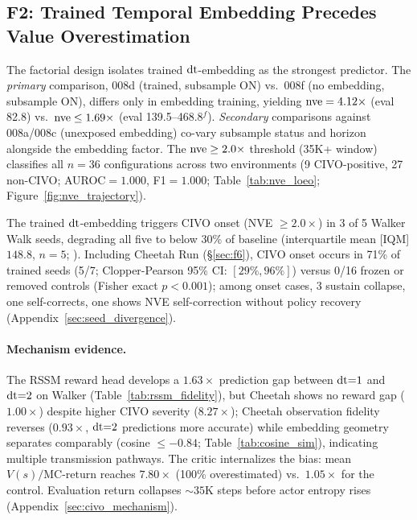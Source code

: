 
\subsection{F2: Trained Temporal Embedding Precedes Value Overestimation}
\label{sec:f2}

 The factorial design isolates trained $\mathrm{dt}$-embedding as the strongest predictor. The \emph{primary} comparison, 008d (trained, subsample ON) vs.\ 008f (no embedding, subsample ON), differs only in embedding training, yielding $\mathrm{nve} = 4.12\times$ (eval 82.8) vs.\ $\mathrm{nve} \leq 1.69\times$ (eval 139.5--468.8$^f$). \emph{Secondary} comparisons against 008a/008c (unexposed embedding) co-vary subsample status and horizon alongside the embedding factor. The $\mathrm{nve} \geq 2.0\times$ threshold (35K+ window) classifies all $n{=}36$ configurations across two environments (9 CIVO-positive, 27 non-CIVO; AUROC${=}1.000$, F1${=}1.000$; Table~\ref{tab:nve_loeo}; Figure~\ref{fig:nve_trajectory}).

 The trained $\mathrm{dt}$-embedding triggers CIVO onset (NVE $\geq 2.0\times$) in 3 of 5 Walker Walk seeds, degrading all five to below 30\% of baseline (interquartile mean [IQM] $148.8$, $n{=}5$; \citet{agarwal2021precipice}). Including Cheetah Run (\S\ref{sec:f6}), CIVO onset occurs in 71\% of trained seeds (5/7; Clopper-Pearson 95\% CI: $[29\%, 96\%]$) versus 0/16 frozen or removed controls (Fisher exact $p < 0.001$); among onset cases, 3 sustain collapse, one self-corrects, one shows NVE self-correction without policy recovery (Appendix~\ref{sec:seed_divergence}).

\paragraph{Mechanism evidence.}
 The RSSM reward head develops a $1.63\times$ prediction gap between $\mathrm{dt}{=}1$ and $\mathrm{dt}{=}2$ on Walker (Table~\ref{tab:rssm_fidelity}), but Cheetah shows no reward gap ($1.00\times$) despite higher CIVO severity ($8.27\times$); Cheetah observation fidelity reverses ($0.93\times$, $\mathrm{dt}{=}2$ predictions more accurate) while embedding geometry separates comparably (cosine ${\leq}{-}0.84$; Table~\ref{tab:cosine_sim}), indicating multiple transmission pathways. The critic internalizes the bias: mean $V(s)/\text{MC-return}$ reaches $7.80\times$ (100\% overestimated) vs.\ $1.05\times$ for the control. Evaluation return collapses ${\sim}35$K steps before actor entropy rises (Appendix~\ref{sec:civo_mechanism}).

